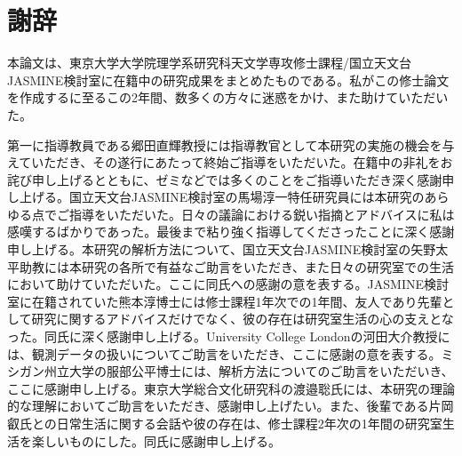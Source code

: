 \documentclass[a4j,a4paper,11pt,oneside,openany,uplatex]{jsbook}
\begin{document}
 \setlength{\abovecaptionskip}{0pt}
 \setlength{\belowcaptionskip}{0pt}
 \captiondelim{: }


\renewcommand\arraystretch{1.1}

%
\frontmatter

\tableofcontents

\mainmatter








\backmatter
\chapter*{謝辞}
本論文は、東京大学大学院理学系研究科天文学専攻修士課程/国立天文台JASMINE検討室に在籍中の研究成果をまとめたものである。私がこの修士論文を作成するに至るこの2年間、数多くの方々に迷惑をかけ、また助けていただいた。

第一に指導教員である郷田直輝教授には指導教官として本研究の実施の機会を与えていただき、その遂行にあたって終始ご指導をいただいた。在籍中の非礼をお詫び申し上げるとともに、ゼミなどでは多くのことをご指導いただき深く感謝申し上げる。国立天文台JASMINE検討室の馬場淳一特任研究員には本研究のあらゆる点でご指導をいただいた。日々の議論における鋭い指摘とアドバイスに私は感嘆するばかりであった。最後まで粘り強く指導してくださったことに深く感謝申し上げる。本研究の解析方法について、国立天文台JASMINE検討室の矢野太平助教には本研究の各所で有益なご助言をいただき、また日々の研究室での生活において助けていただいた。ここに同氏への感謝の意を表する。JASMINE検討室に在籍されていた熊本淳博士には修士課程1年次での1年間、友人であり先輩として研究に関するアドバイスだけでなく、彼の存在は研究室生活の心の支えとなった。同氏に深く感謝申し上げる。University College Londonの河田大介教授には、観測データの扱いについてご助言をいただき、ここに感謝の意を表する。ミシガン州立大学の服部公平博士には、解析方法についてのご助言をいただいき、ここに感謝申し上げる。東京大学総合文化研究科の渡邉聡氏には、本研究の理論的な理解においてご助言をいただき、感謝申し上げたい。また、後輩である片岡叡氏との日常生活に関する会話や彼の存在は、修士課程2年次の1年間の研究室生活を楽しいものにした。同氏に感謝申し上げる。

\appendix




\end{document}
